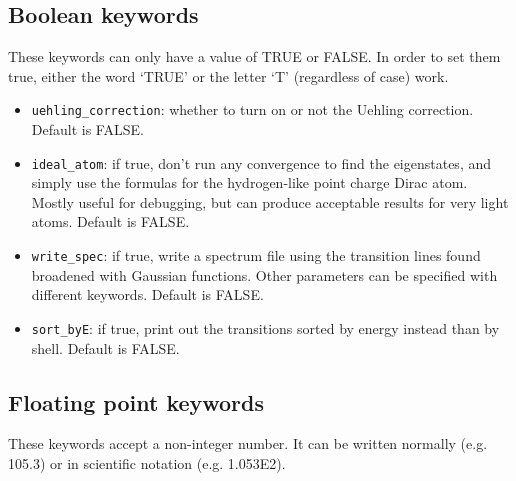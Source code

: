\documentclass[]{article}
\begin{document}
\subsection{Boolean keywords}

These keywords can only have a value of TRUE or FALSE. In order to set them true, either the word `TRUE' or the letter `T' (regardless of case) work.

\begin{itemize}
	\item \texttt{uehling\_correction}: whether to turn on or not the Uehling correction. Default is FALSE.
	\item \texttt{ideal\_atom}: if true, don't run any convergence to find the eigenstates, and simply use the formulas for the hydrogen-like point charge Dirac atom. Mostly useful for debugging, but can produce acceptable results for very light atoms. Default is FALSE.
	\item \texttt{write\_spec}: if true, write a spectrum file using the transition lines found broadened with Gaussian functions. Other parameters can be specified with different keywords. Default is FALSE.
	\item \texttt{sort\_byE}: if true, print out the transitions sorted by energy instead than by shell. Default is FALSE.
\end{itemize}

\subsection{Floating point keywords}

These keywords accept a non-integer number. It can be written normally (e.g. 105.3) or in scientific notation (e.g. 1.053E2).
\end{document}
